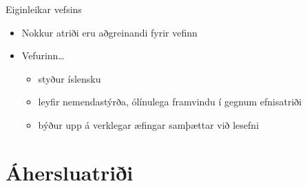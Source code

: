 \documentclass[hi-blar]{beamer}
\begin{document}
\begin{frame}{Eiginleikar vefsins}
    \begin{itemize}
        \item Nokkur atriði eru aðgreinandi fyrir vefinn
        \item Vefurinn\ldots
        \begin{itemize}
            \item styður íslensku
            \item leyfir nemendastýrða, ólínulega framvindu í gegnum efnisatriði
            \item býður upp á verklegar æfingar samþættar við lesefni
        \end{itemize}
    \end{itemize}
\end{frame}

\section{Áhersluatriði}
\end{document}
